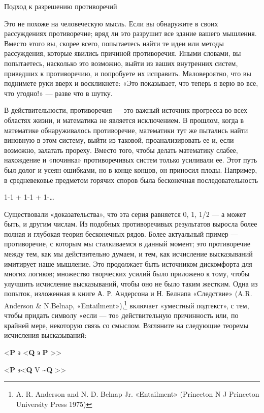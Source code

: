 Подход к разрешению противоречий

Это не похоже на человеческую мысль. Если вы обнаружите в своих рассуждениях противоречие; вряд ли это разрушит все здание вашего мышления. Вместо этого вы, скорее всего, попытаетесь найти те идеи или методы рассуждения, которые явились причиной противоречия. Иными словами, вы попытаетесь, насколько это возможно, выйти из ваших внутренних систем, приведших к противоречию, и попробуете их исправить. Маловероятно, что вы поднимете руки вверх и воскликнете: «Это показывает, что теперь я верю во все, что угодно!» --- разве что в шутку.

В действительности, противоречия --- это важный источник прогресса во всех областях жизни, и математика не является исключением. В прошлом, когда в математике обнаруживалось противоречие, математики тут же пытались найти виновную в этом систему, выйти из таковой, проанализировать ее и, если возможно, залатать прореху. Вместо того, чтобы делать математику слабее, нахождение и «починка» противоречивых систем только усиливали ее. Этот путь был долог и усеян ошибками, но в конце концов, он приносил плоды. Например, в средневековье предметом горячих споров была бесконечная последовательность

1-1 + 1-1 + 1-\ldots{}

Существовали «доказательства», что эта серия равняется 0, 1, 1/2 --- а может быть, и другим числам. Из подобных противоречивых результатов выросла более полная и глубокая теория бесконечных рядов. Более актуальный пример --- противоречие, с которым мы сталкиваемся в данный момент; это противоречие между тем, как мы действительно думаем, и тем, как исчисление высказываний имитирует наше мышление. Это продолжает быть источником дискомфорта для многих логиков; множество творческих усилий было приложено к тому, чтобы улучшить исчисление высказываний, чтобы оно не было таким жестким. Одна из попыток, изложенная в книге А. Р. Андерсона и Н. Белнапа «Следствие» (A.R. Anderson \& N.Belnap, «Entailment»),\footnote{A. R. Anderson and N. D. Belnap Jr. «Entailment» (Princeton N J Princeton University Press 1975)} включает «уместный подтекст», с тем, чтобы придать символу «если --- то» действительную причинность или, по крайней мере, некоторую связь со смыслом. Взгляните на следующие теоремы исчисления высказываний:

\textless{}\textbf{P} э \textless{}\textbf{Q} э \textbf{P} \textgreater\textgreater{}

\textless{}\textbf{P} э\textless{}\textbf{Q} V \textbf{\textasciitilde Q} \textgreater\textgreater{}

